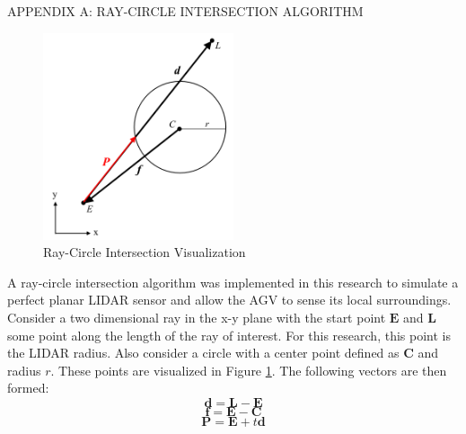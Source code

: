 \documentclass[12pt,onecolumn]{report}
\begin{document}
\begin{singlespacing}


\end{singlespacing}

\newpage
\setcounter{chapter}{9}
\begin{noindent}
APPENDIX A: RAY-CIRCLE INTERSECTION ALGORITHM
\end{noindent}

\begin{figure}[H]
	\centering
	\includegraphics[width=0.5\textwidth]{Figs/rayCircle.png}
	\caption{{\small Ray-Circle Intersection Visualization}}    
	\label{fig:RayCircleIntersection}
\end{figure}

A ray-circle intersection algorithm was implemented in this research to simulate a perfect planar LIDAR sensor and allow the AGV to sense its local surroundings. Consider a two dimensional ray in the x-y plane with the start point $\boldsymbol{E}$ and $\boldsymbol{L}$ some point along the length of the ray of interest. For this research, this point is the LIDAR radius. Also consider a circle with a center point defined as $\boldsymbol{C}$ and radius $r$. These points are visualized in Figure \ref{fig:RayCircleIntersection}. The following vectors are then formed:
%
\begin{equation}\label{e:RayVector}
\boldsymbol{d} = \boldsymbol{L} - \boldsymbol{E}
\end{equation}
\begin{equation}\label{e:CircleCenterVector}
\boldsymbol{f} = \boldsymbol{E} - \boldsymbol{C} 
\end{equation}
\begin{equation}\label{e:Intersection}
\boldsymbol{P} = \boldsymbol{E} + t\boldsymbol{d}
\end{equation}
\end{document}
